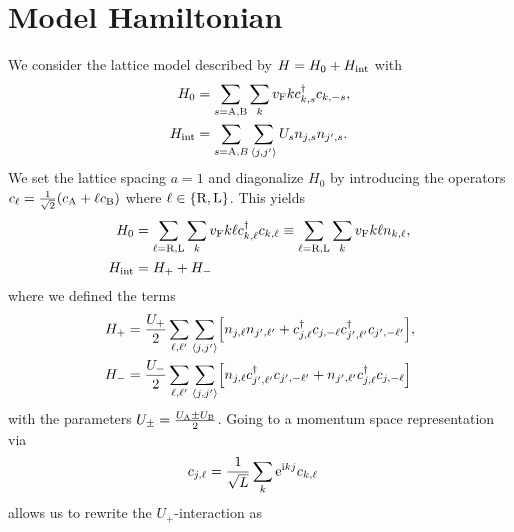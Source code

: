 \documentclass[english, parskip=full]{scrartcl}
\title{\titel}
\author{\autor}
\date{\today}
\begin{document}
\maketitle  %

\section{Model Hamiltonian}
We consider the lattice model described by $H=H_0+H_\Text{int}$ with
\begin{align}
H_0 &= \sum_{s=\A,\B} \sum_k \vf k c_{k,s}^\dagger c_{k,-s},\\
H_\Text{int} &= \sum_{s=\A,B} \sum_{\bra*{j,j'}} U_s n_{j,s} n_{j',s}.
\end{align}
We set the lattice spacing $a=1$ and diagonalize $H_0$ by introducing the operators $c_\ell = \frac{1}{\sqrt{2}} \kla*{c_\A + \ell c_\B}$ where $\ell\in\klc*{\R,\L}$.
This yields
\begin{align}
H_0 &= \sum_{\ell=\R,\L} \sum_k \vf k\ell c_{k,\ell}^\dagger c_{k,\ell} \equiv \sum_{\ell=\R,\L} \sum_k \vf k\ell n_{k,\ell},\\
H_\Text{int} &= H_+ + H_-
\end{align}
where we defined the terms
\begin{align}
H_+ &= \frac{U_+}{2} \sum_{\ell,\ell'} \sum_{\bra*{j,j'}} \klb*{n_{j,\ell} n_{j',\ell'} + c_{j,\ell}^\dagger c_{j,-\ell} c_{j',\ell'}^\dagger c_{j',-\ell'}},\\
H_- &= \frac{U_-}{2} \sum_{\ell,\ell'} \sum_{\bra*{j,j'}} \klb*{ n_{j,\ell} c_{j',\ell'}^\dagger c_{j',-\ell'} + n_{j',\ell'} c_{j,\ell}^\dagger c_{j,-\ell}}
\end{align}
with the parameters $U_\pm = \frac{U_\A \pm U_\B}{2}$.
Going to a momentum space representation via
\begin{align}
c_{j,\ell} &= \frac{1}{\sqrt{L}} \sum_k \powe{\i kj} c_{k,\ell}
\end{align}
allows us to rewrite the $U_+$-interaction as
\end{document}
